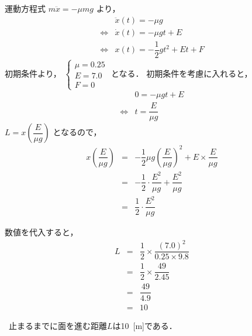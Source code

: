 \documentclass[a4paper,11pt]{ltjsarticle}
\begin{document}
\begin{enumerate}
    運動方程式 $m \ddot{x}=-\mu mg$ より，
    \begin{equation}
      \renewcommand{\arraystretch}{2}
      \begin{array}{rl}
        & \ddot{x}(t) = - \mu g
        \\
        \Leftrightarrow
        & \dot{x}(t) = - \mu gt + E
        \\
        \Leftrightarrow
        & x(t) = -\dfrac{1}{2}gt^{2}+Et+F
      \end{array}
    \end{equation}
    初期条件より，
    $
    \begin{cases}
      \mu = 0.25 \\
      E = 7.0 \\
      F = 0
    \end{cases}
    $
    となる．
    初期条件を考慮に入れると，
    \begin{equation}
      \renewcommand{\arraystretch}{2}
      \begin{array}{rl}
        & 0= - \mu gt + E
        \\
        \Leftrightarrow
        & t= \dfrac{E}{\mu g}
      \end{array}
    \end{equation}
    $L = x \left(\dfrac{E}{\mu g}\right)$ となるので，
    \begin{equation}
      \renewcommand{\arraystretch}{2.5}
      \begin{array}{rcl}
        x \left(\dfrac{E}{\mu g}\right)
        &=&
        -\dfrac{1}{2} \mu g \left(\dfrac{E}{\mu g}\right)^{2} + E \times \dfrac{E}{\mu g}
        \\
        &=& -\dfrac{1}{2} \cdot \dfrac{E^{2}}{\mu g} + \dfrac{E^{2}}{\mu g}
        \\
        &=& \dfrac{1}{2} \cdot \dfrac{E^{2}}{\mu g}
      \end{array}
    \end{equation}

    数値を代入すると，
    \begin{equation}
      \renewcommand{\arraystretch}{2.5}
      \begin{array}{rcl}
        L
        &=&
        \dfrac{1}{2} \times \dfrac{(7.0)^2}{0.25 \times 9.8}
        \\
        &=&
        \dfrac{1}{2} \times \dfrac{49}{2.45}
        \\
        &=&
        \dfrac{49}{4.9}
        \\
        &=&
        10
      \end{array}
    \end{equation}

    \begin{center}
      \therefore\ 止まるまでに面を進む距離$L$は10\ [m]である．
    \end{center}

\end{enumerate}
\end{document}
